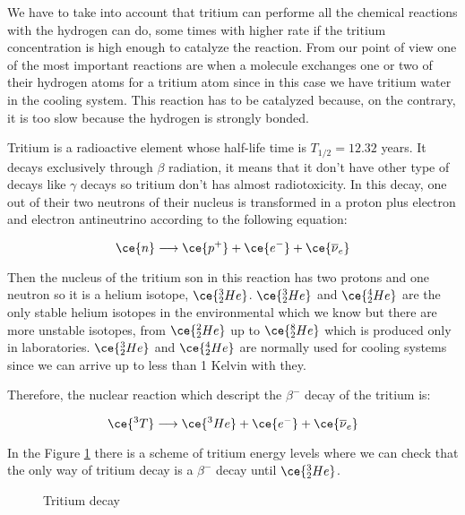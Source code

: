 We have to take into account that tritium can performe all the chemical reactions with the hydrogen can do, some times with higher rate if the tritium concentration is high enough to catalyze the reaction. From our point of view one of the most important reactions are when a molecule exchanges one or two  of their hydrogen atoms for a tritium atom since in this case we have tritium water in the cooling system. This reaction has to be catalyzed because, on the contrary, it is too slow because the hydrogen is strongly bonded. 

Tritium is a radioactive element whose half-life time is $T_{1/2}= 12.32$ years. It decays exclusively through $\beta$ radiation, it means that it don't have other type of decays like $\gamma$ decays so tritium don't has almost radiotoxicity. In this decay, one out of their two neutrons of their nucleus is transformed in a proton plus electron and electron antineutrino according to the following equation:

\begin{equation}
\ce{n} \longrightarrow \ce{p^+}  + \ce{e^-}  + \ce{\overline{\nu}_e}
\label{BetaDecay}
\end{equation}

Then the nucleus of the tritium son in this reaction has two protons and one neutron so it is a helium isotope, $\ce{^{3}_{2}He}$. $\ce{^{3}_{2}He}$ and $\ce{^{4}_{2}He}$ are the only stable helium isotopes in the environmental which we know but there are more unstable isotopes, from $\ce{^{2}_{2}He}$ up to $\ce{^{8}_{2}He}$ which is produced only in laboratories. $\ce{^{3}_{2}He}$ and $\ce{^{4}_{2}He}$ are normally used for cooling systems since we can arrive up to less than 1 Kelvin with they.

Therefore, the nuclear reaction which descript the $\beta^-$ decay of the tritium is:

\begin{equation}
\ce{^{3}T} \longrightarrow \ce{^{3}He}  + \ce{e^-}  + \ce{\overline{\nu}_e}
\label{TritiumDecay}
\end{equation}

In the Figure \ref{fig:TritiumDecay} there is a scheme of tritium energy levels where we can check that the only way of tritium decay is a $\beta^{-}$ decay until $\ce{^{3}_{2}He}$.

\begin{figure}
 \centering
 \caption{Tritium decay}
 \label{fig:TritiumDecay}
\end{figure}

